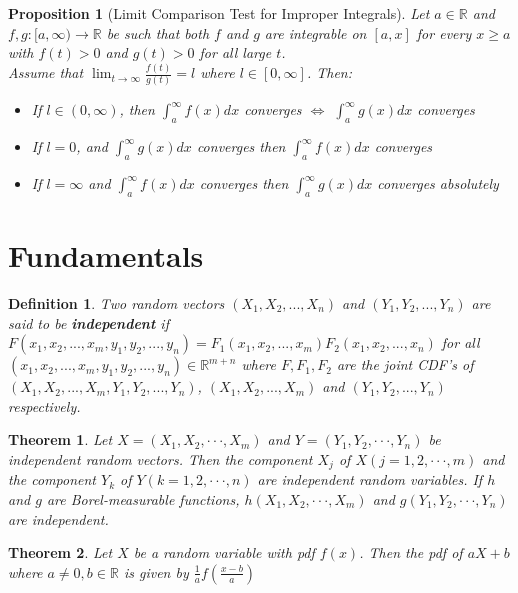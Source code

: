 \documentclass[12pt,twoside]{report}
\theoremstyle{thmstyle}
\newtheorem{defn}{Definition}
\newtheorem{thm}{Theorem}
\newtheorem{prop}[subsection]{Proposition}
\begin{document}
\begin{prop}[Limit Comparison Test for Improper Integrals]
    Let $a \in \mathbb{R}$ and $f,g: [a, \infty) \to \mathbb{R}$ be such that both $f$ and $g$ are integrable on $[a,x]$ for every $x \geq a$ with $f(t) > 0$ and $g(t) > 0$ for all large $t$. \\ Assume that
    $\displaystyle \lim_{t \to \infty} \frac{f(t)}{g(t)} = l$ where $l \in [0, \infty]$. Then:
    \begin{itemize}
        \item If $l \in (0, \infty)$, then $\int_a^\infty f(x)dx$ converges $\iff$ $\int_a^\infty g(x)dx$ converges
        \item If $l = 0$, and $\int_a^\infty g(x)dx$ converges then $\int_a^\infty f(x)dx$ converges
        \item If $l = \infty$ and $\int_a^\infty f(x)dx$ converges then $\int_a^\infty g(x)dx$ converges absolutely
    \end{itemize}
\end{prop}

\section{Fundamentals}

\begin{defn}
    Two random vectors $(X_1, X_2, ... , X_n)$ and $(Y_1, Y_2, ... , Y_n)$ are said to be \textbf{independent} if $F(x_1, x_2, ..., x_m, y_1, y_2, ..., y_n) = F_1 (x_1, x_2, ..., x_m) F_2 (x_1, x_2, ..., x_n)$ for all $(x_1, x_2, ..., x_m, y_1, y_2, ..., y_n) \in \mathbb{R}^{m+n}$ where $F, F_1, F_2$ are the joint CDF's of $(X_1, X_2, ..., X_m, Y_1, Y_2, ..., Y_n)$, $(X_1, X_2, ..., X_m)$ and $(Y_1, Y_2, ..., Y_n)$ respectively.
\end{defn}

\begin{thm}
    Let $X = (X_1, X_2, · · · , X_m)$ and $Y = (Y_1, Y_2, · · · , Y_n)$ be independent random vectors. Then the component $X_j$ of $X(j = 1, 2, · · · , m)$ and the component $Y_k$ of $Y(k = 1, 2, · · · , n)$ are independent random variables. If $h$ and $g$ are Borel-measurable functions, $h(X_1, X_2, · · · , X_m)$ and $g(Y_1, Y_2, · · · , Y_n)$ are independent.
\end{thm}

\begin{thm}
    Let $X$ be a random variable with pdf $f(x)$. Then the pdf of $aX+b$ where $a \neq 0, b \in \mathbb{R}$ is given by $\displaystyle \frac{1}{a} f \left (\frac{x-b}{a} \right)$
\end{thm}
\end{document}
